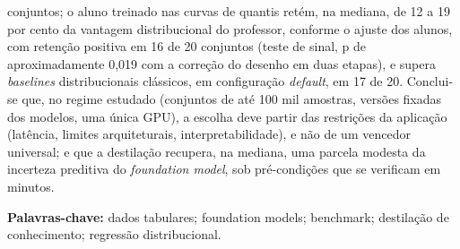 conjuntos; o aluno treinado nas curvas de quantis retém, na mediana, de
12 a 19 por cento da vantagem distribucional do professor, conforme o
ajuste dos alunos, com retenção positiva em 16 de 20 conjuntos (teste de
sinal, p de aproximadamente 0,019 com a correção do desenho em duas
etapas), e supera \emph{baselines} distribucionais clássicos, em configuração
\emph{default}, em 17 de
20. Conclui-se que, no regime estudado (conjuntos de até 100 mil
amostras, versões fixadas dos modelos, uma única GPU), a escolha deve
partir das restrições da aplicação (latência, limites arquiteturais,
interpretabilidade), e não de um vencedor universal; e que a destilação
recupera, na mediana, uma parcela modesta da incerteza preditiva do
\emph{foundation model}, sob pré-condições que se verificam em minutos.

\vspace{1cm}
\noindent\textbf{Palavras-chave:} dados tabulares; foundation models;
benchmark; destilação de conhecimento; regressão distribucional.
